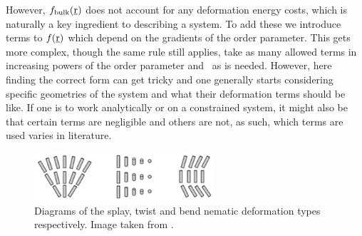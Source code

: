 \documentclass[12pt]{article}
\newcommand{\mgrad}{\suf{\nabla}{K}}
\newcommand{\suf}[2]{\stackunder[1pt]{#1}{\rule{\widthof{#2}*\real{1.1}}{.1ex}}}
\newcommand{\su}[1]{\suf{#1}{#1}}
\begin{document}
However, $f_\text{bulk}(\su{r})$ does not account for any deformation energy costs, which is naturally a key ingredient to describing a system.
To add these we introduce terms to $f(\su{r})$ which depend on the gradients of the order parameter.
This gets more complex, though the same rule still applies, take as many allowed terms in increasing powers of the order parameter and \mgrad\ as is needed.
However, here finding the correct form can get tricky and one generally starts considering specific geometries of the system and what their deformation terms should be like.
If one is to work analytically or on a constrained system, it might also be that certain terms are negligible and others are not, as such, which terms are used varies in literature.

\begin{figure}[t]
    \begin{center}
        \includegraphics[width=0.6\textwidth]{figures/nematic_deformations.jpg}
    \end{center}
    \caption{
        Diagrams of the splay, twist and bend nematic deformation types respectively.
        Image taken from \cite{suryantariImageFeatureExtraction2019}.
    }\label{fig:nem_deform}
\end{figure}
\end{document}
